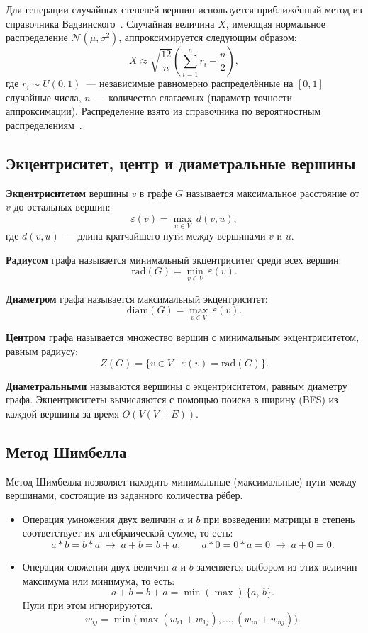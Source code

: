 \documentclass[a4paper,final]{article}
\begin{document}
Для генерации случайных степеней вершин используется приближённый метод из справочника Вадзинского~\cite{vadzinsky}. Случайная величина $X$, имеющая нормальное распределение $\mathcal{N}(\mu,\sigma^2)$, аппроксимируется следующим образом:
\[
X \approx \sqrt{\frac{12}{n}}\left(\sum_{i=1}^{n} r_i - \frac{n}{2}\right),
\]
где $r_i \sim U(0,1)$~--- независимые равномерно распределённые на $[0,1]$ случайные числа, $n$~--- количество слагаемых (параметр точности аппроксимации). Распределение взято из справочника по вероятностным распределениям~\cite{vadzinsky}.

	\subsection{Экцентриситет, центр и диаметральные вершины}

\textbf{Экцентриситетом} вершины $v$ в графе $G$ называется максимальное расстояние от $v$ до остальных вершин:
\[
\varepsilon(v) = \max_{u \in V}\, d(v, u),
\]
где $d(v, u)$~--- длина кратчайшего пути между вершинами $v$ и $u$.

\textbf{Радиусом} графа называется минимальный экцентриситет среди всех вершин:
\[
\mathrm{rad}(G) = \min_{v \in V}\, \varepsilon(v).
\]

\textbf{Диаметром} графа называется максимальный экцентриситет:
\[
\mathrm{diam}(G) = \max_{v \in V}\, \varepsilon(v).
\]

\textbf{Центром} графа называется множество вершин с минимальным экцентриситетом, равным радиусу:
\[
Z(G) = \{v \in V \mid \varepsilon(v) = \mathrm{rad}(G)\}.
\]

\textbf{Диаметральными} называются вершины с экцентриситетом, равным диаметру графа. Экцентриситеты вычисляются с помощью поиска в ширину (BFS) из каждой вершины за время $O(V(V+E))$.

	\subsection{Метод Шимбелла}

Метод Шимбелла позволяет находить минимальные (максимальные) пути между вершинами, состоящие из заданного количества рёбер.

\begin{itemize}
  \item Операция умножения двух величин $a$ и $b$ при возведении матрицы в степень соответствует их алгебраической сумме, то есть:
  \[a * b = b * a \;\to\; a + b = b + a,\qquad a * 0 = 0 * a = 0 \;\to\; a + 0 = 0.\]
  \item Операция сложения двух величин $a$ и $b$ заменяется выбором из этих величин максимума или минимума, то есть:
  \[a + b = b + a = \min(\max)\,\{a,\,b\}.\]
  Нули при этом игнорируются.
  \[w_{ij} = \min\bigl(\max(w_{i1}+w_{1j}),\ldots,(w_{in}+w_{nj})\bigr).\]
\end{itemize}
\end{document}

